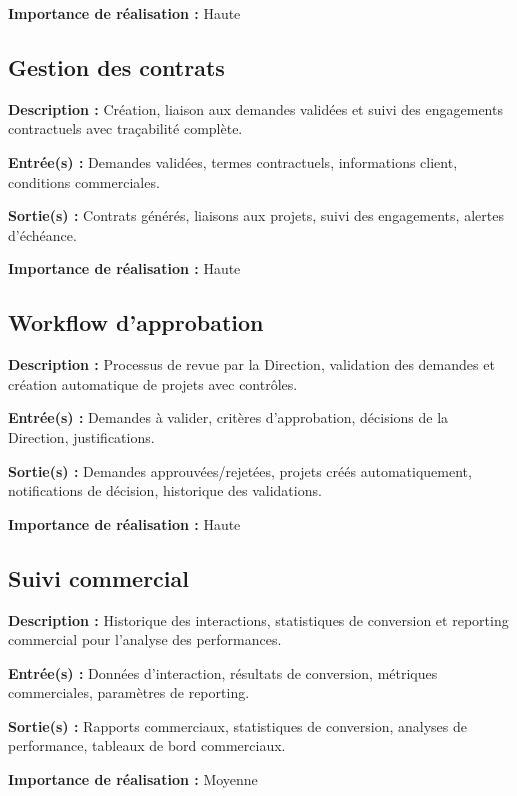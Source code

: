 \textbf{Importance de réalisation :} Haute

\subsection{Gestion des contrats}
\textbf{Description :} Création, liaison aux demandes validées et suivi des engagements contractuels avec traçabilité complète.

\textbf{Entrée(s) :} Demandes validées, termes contractuels, informations client, conditions commerciales.

\textbf{Sortie(s) :} Contrats générés, liaisons aux projets, suivi des engagements, alertes d'échéance.

\textbf{Importance de réalisation :} Haute

\subsection{Workflow d'approbation}
\textbf{Description :} Processus de revue par la Direction, validation des demandes et création automatique de projets avec contrôles.

\textbf{Entrée(s) :} Demandes à valider, critères d'approbation, décisions de la Direction, justifications.

\textbf{Sortie(s) :} Demandes approuvées/rejetées, projets créés automatiquement, notifications de décision, historique des validations.

\textbf{Importance de réalisation :} Haute

\subsection{Suivi commercial}
\textbf{Description :} Historique des interactions, statistiques de conversion et reporting commercial pour l'analyse des performances.

\textbf{Entrée(s) :} Données d'interaction, résultats de conversion, métriques commerciales, paramètres de reporting.

\textbf{Sortie(s) :} Rapports commerciaux, statistiques de conversion, analyses de performance, tableaux de bord commerciaux.

\textbf{Importance de réalisation :} Moyenne

